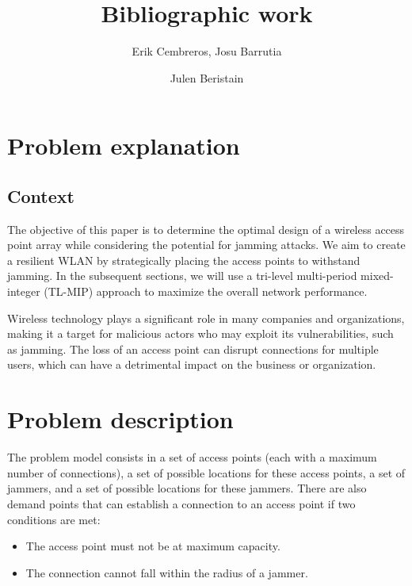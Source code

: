 \documentclass[runningheads]{llncs}
\begin{document}
	\title{Bibliographic work}
	\author{Erik Cembreros,
		Josu Barrutia \and
		Julen Beristain}
	\maketitle              %

\section{Problem explanation}
\subsection{Context}

 The objective of this paper is to determine the optimal design of a wireless access point array while considering the potential for jamming attacks. We aim to create a resilient WLAN by strategically placing the access points to withstand jamming. In the subsequent sections, we will use a tri-level multi-period mixed-integer (TL-MIP) approach to maximize the overall network performance.
 
Wireless technology plays a significant role in many companies and organizations, making it a target for malicious actors who may exploit its vulnerabilities, such as jamming. The loss of an access point can disrupt connections for multiple users, which can have a detrimental impact on the business or organization.

\section{Problem description}

The problem model consists in a set of access points (each with a maximum number of connections), a set of possible locations for these access points, a set of jammers, and a set of possible locations for these jammers.
There are also demand points that can establish a connection to an access point if two conditions are met:

\begin{itemize}
    \item The access point must not be at maximum capacity.
    \item The connection cannot fall within the radius of a jammer.
\end{itemize}
\end{document}
